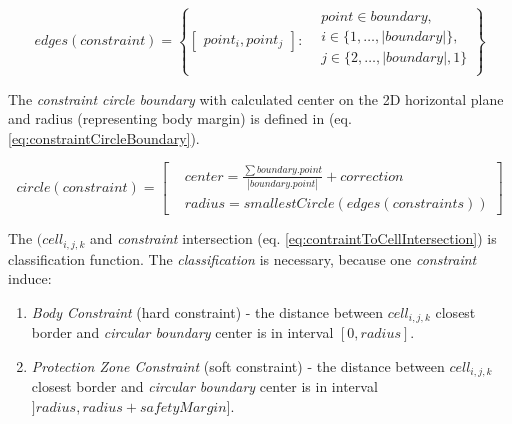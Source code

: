 \begin{equation}\label{eq:constraintEdgeSet}
    edges(constraint) =
    \left\{
    \begin{bmatrix}
        point_{i},point_{j}
    \end{bmatrix}:
    \begin{aligned}
    &point\in boundary,\\
    &i \in \{1,\dots,|boundary|\},\\
    &j \in \{2,\dots, |boundary|,1\}\\
    \end{aligned}
    \right\}
\end{equation}

\noindent The \emph{constraint circle boundary} with calculated center on the  2D horizontal plane and radius (representing body margin) is defined in (eq. \ref{eq:constraintCircleBoundary}).

\begin{equation}\label{eq:constraintCircleBoundary}
    circle(constraint)=
    \left[
        \begin{aligned}
            & center = \frac{\sum boundary.point}{|boundary.point|} + correction\\
            & radius = smallest Circle(edges(constraints)) 
        \end{aligned}
    \right]
\end{equation}

\noindent The $(cell_{i,j,k}$ and \emph{constraint} intersection (eq. \ref{eq:contraintToCellIntersection}) is classification function. The \emph{classification} is necessary, because one \emph{constraint} induce: 
\begin{enumerate}
    \item \emph{Body Constraint} (hard constraint) - the distance between $cell_{i,j,k}$ closest border and \emph{circular boundary} center is in interval $[0,radius]$.
    
    \item \emph{Protection Zone Constraint} (soft constraint) - the distance between $cell_{i,j,k}$ closest border and \emph{circular boundary} center is in interval $]radius,radius+safety Margin]$.
\end{enumerate}


